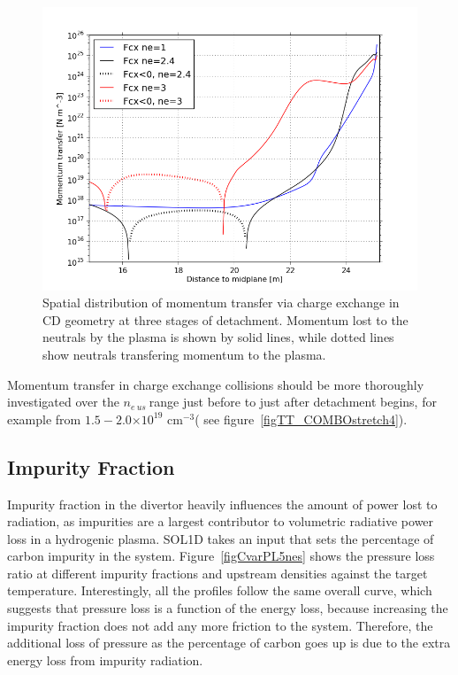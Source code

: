 \documentclass[12pt]{article}  %
\providecommand{\e}[1]{\ensuremath{\times 10^{#1}}} %
\providecommand{\pow}[1]{{$^{#1}$}} %
\providecommand{\neus}{$n_{e~us}~$} %
\begin{document}
\begin{figure}
\includegraphics[scale=0.6]{Figures/sol1d/balFcx16m.png}
\centering
\caption{Spatial distribution of momentum transfer via charge exchange in CD geometry at three stages of detachment. Momentum lost to the neutrals by the plasma is shown by solid lines, while dotted lines show neutrals transfering momentum to the plasma.}\label{figbalFcx16m}
\end{figure}

Momentum transfer in charge exchange collisions should be more thoroughly investigated over the \neus range just before to just after detachment begins, for example from $1.5 - 2.0\e{19}$ cm\pow{-3}( see figure~\ref{figTT_COMBOstretch4}).



\subsection{Impurity Fraction}\label{ssecImpfrac}
Impurity fraction in the divertor heavily influences the amount of power lost to radiation, as impurities are a largest contributor to volumetric radiative power loss in a hydrogenic plasma. SOL1D takes an input that sets the percentage of carbon impurity in the system. Figure~\ref{figCvarPL5nes} shows the pressure loss ratio at different impurity fractions and upstream densities against the target temperature. Interestingly, all the profiles follow the same overall curve, which suggests that pressure loss is a function of the energy loss, because increasing the impurity fraction does not add any more friction to the system. Therefore, the additional loss of pressure as the percentage of carbon goes up is due to the extra energy loss from impurity radiation.
\end{document}
